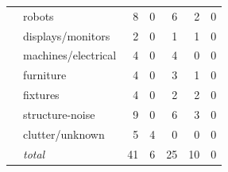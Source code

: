 \begin{table}[htbp]
\begin{tabular}{l l r r r r r}
 & robots & 8 & 0 & 6 & 2 & 0 \\
 & displays/monitors & 2 & 0 & 1 & 1 & 0 \\
 & machines/electrical & 4 & 0 & 4 & 0 & 0 \\
 & furniture & 4 & 0 & 3 & 1 & 0 \\
 & fixtures & 4 & 0 & 2 & 2 & 0 \\
 & structure-noise & 9 & 0 & 6 & 3 & 0 \\
 & clutter/unknown & 5 & 4 & 0 & 0 & 0 \\
 & \emph{total} & 41 & 6 & 25 & 10 & 0 \\
\bottomrule
\end{tabular}
\end{table}
